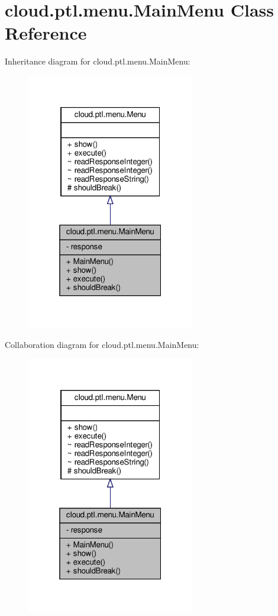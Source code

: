\hypertarget{classcloud_1_1ptl_1_1menu_1_1MainMenu}{}\section{cloud.\+ptl.\+menu.\+Main\+Menu Class Reference}
\label{classcloud_1_1ptl_1_1menu_1_1MainMenu}


Inheritance diagram for cloud.\+ptl.\+menu.\+Main\+Menu\+:
\nopagebreak
\begin{figure}[H]
\begin{center}
\leavevmode
\includegraphics[width=208pt]{classcloud_1_1ptl_1_1menu_1_1MainMenu__inherit__graph}
\end{center}
\end{figure}


Collaboration diagram for cloud.\+ptl.\+menu.\+Main\+Menu\+:
\nopagebreak
\begin{figure}[H]
\begin{center}
\leavevmode
\includegraphics[width=208pt]{classcloud_1_1ptl_1_1menu_1_1MainMenu__coll__graph}
\end{center}
\end{figure}
